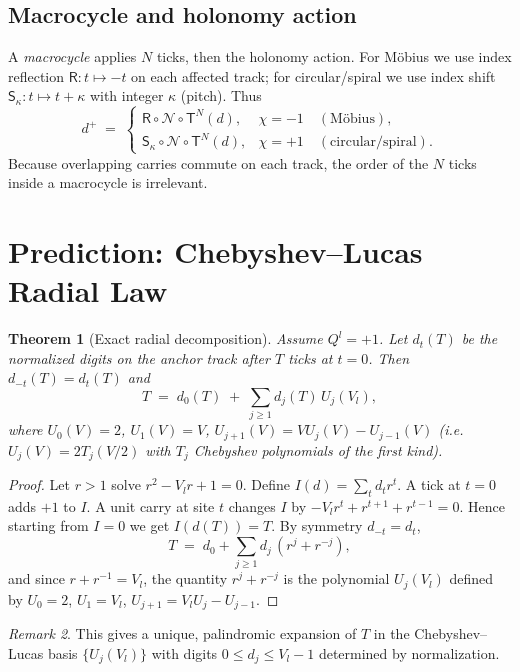 \documentclass[11pt]{article}
\newtheorem{theorem}{Theorem}[section]
\theoremstyle{definition}
\theoremstyle{remark}
\newtheorem{remark}[theorem]{Remark}
\begin{document}
\subsection{Macrocycle and holonomy action}
A \emph{macrocycle} applies $N$ ticks, then the holonomy action. For M\"obius we use index reflection $\mathsf R: t\mapsto -t$ on each affected track; for circular/spiral we use index shift $\mathsf S_\kappa: t\mapsto t+\kappa$ with integer $\kappa$ (pitch). Thus
\begin{equation}\label{eq:macro-update}
d^{+} \;=\;
\begin{cases}
\mathsf R\circ \mathcal N \circ \mathsf T^{N}(d), & \chi=-1\quad(\text{M\"obius}),\\[3pt]
\mathsf S_\kappa\circ \mathcal N \circ \mathsf T^{N}(d), & \chi=+1\quad(\text{circular/spiral}).
\end{cases}
\end{equation}
Because overlapping carries commute on each track, the order of the $N$ ticks inside a macrocycle is irrelevant.


\section{Prediction: Chebyshev--Lucas Radial Law}
\label{sec:killer}

\begin{theorem}[Exact radial decomposition]
Assume $Q^l=+1$. Let $d_t(T)$ be the normalized digits on the anchor track after $T$ ticks at $t=0$. Then $d_{-t}(T)=d_t(T)$ and
\[
T \;=\; d_0(T)\;+\;\sum_{j\ge1} d_j(T)\,U_j(V_l),
\]
where $U_0(V)=2$, $U_1(V)=V$, $U_{j+1}(V)=V U_j(V)-U_{j-1}(V)$ (i.e.\ $U_j(V)=2T_j(V/2)$ with $T_j$ Chebyshev polynomials of the first kind).
\end{theorem}

\begin{proof}
Let $r>1$ solve $r^2-V_l r+1=0$. Define $I(d)=\sum_t d_t r^t$. A tick at $t=0$ adds $+1$ to $I$. A unit carry at site $t$ changes $I$ by $-V_l r^t+r^{t+1}+r^{t-1}=0$. Hence starting from $I=0$ we get $I(d(T))=T$. By symmetry $d_{-t}=d_t$,
\[
T \;=\; d_0+\sum_{j\ge1} d_j\,(r^j+r^{-j}),
\]
and since $r+r^{-1}=V_l$, the quantity $r^j+r^{-j}$ is the polynomial $U_j(V_l)$ defined by $U_0=2$, $U_1=V_l$, $U_{j+1}=V_l U_j-U_{j-1}$.
\end{proof}

\begin{remark}
This gives a unique, palindromic expansion of $T$ in the Chebyshev--Lucas basis $\{U_j(V_l)\}$ with digits $0\le d_j\le V_l-1$ determined by normalization.
\end{remark}
\end{document}
